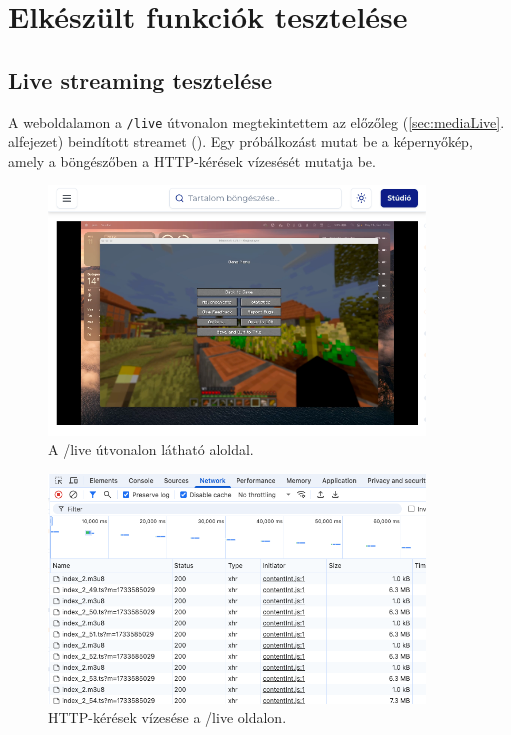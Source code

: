 \chapter{Elkészült funkciók tesztelése}

\section{Live streaming tesztelése}

A weboldalamon a \verb|/live| útvonalon megtekintettem az előzőleg (\ref{sec:mediaLive}. alfejezet) beindított streamet (). Egy próbálkozást mutat be a  képernyőkép, amely a böngészőben a HTTP-kérések vízesését\cite{waterfall} mutatja be.

\begin{figure}[h]
  \centering
  \includegraphics[width=100mm, keepaspectratio]{figures/waterfall1.png}
  \caption{A /live útvonalon látható aloldal.}
  \label{fig:waterfall1}
\end{figure}

\begin{figure}[h]
  \centering
  \includegraphics[width=100mm, keepaspectratio]{figures/waterfall2.png}
  \caption{HTTP-kérések vízesése a /live oldalon.}
  \label{fig:waterfall2}
\end{figure}

